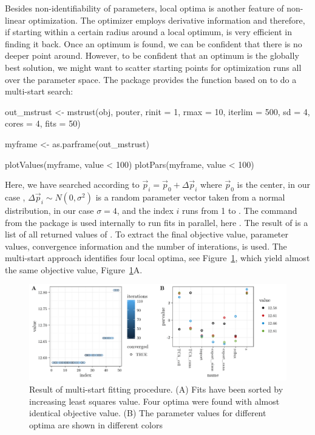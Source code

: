 \documentclass[article]{jss}
\begin{document}
Besides non-identifiability of parameters, local optima is another feature of non-linear optimization. The  optimizer employs derivative information and therefore, if starting within a certain radius around a local optimum, is very efficient in finding it back. Once an optimum is found, we can be confident that there is no deeper point around. However, to be confident that an optimum is the globally best solution, we might want to scatter starting points for optimization runs all over the parameter space. The  package provides the  function based on  to do a multi-start search:
\begin{CodeChunk}
\begin{CodeInput}
out_mstrust <- mstrust(obj, pouter, rinit = 1, rmax = 10, iterlim = 500,
                       sd = 4,
                       cores = 4, fits = 50)

myframe <- as.parframe(out_mstrust)

plotValues(myframe, value < 100)
plotPars(myframe, value < 100)
\end{CodeInput}
\end{CodeChunk}
Here, we have searched according to $\vec p_i = \vec p_0 + \Delta\vec p_i$ where $\vec p_0$ is the center, in our case , $\Delta\vec p_i\sim N(0, \sigma^2)$ is a random parameter vector taken from a normal distribution, in our case $\sigma = 4$, and the index $i$ runs from 1 to . The  command from the  package is used internally to run fits in parallel, here . The result of  is a list of all returned values of . To extract the final objective value, parameter values, convergence information and the number of interations,  is used. The multi-start approach identifies four local optima, see Figure~\ref{fig:mstrust}, which yield almost the same objective value, Figure~\ref{fig:mstrust}A.
\begin{figure}[ht]
	\centering
	\includegraphics[width = \textwidth]{images/figure5}
	\caption{Result of multi-start fitting procedure. (A) Fits have been sorted by increasing least squares value. Four optima were found with almost identical objective value. (B) The parameter values for different optima are shown in different colors }
	\label{fig:mstrust}
\end{figure}
\end{document}
